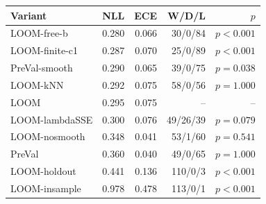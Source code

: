 \begin{tabular}{lrrrr}
\toprule
Variant & NLL & ECE & W/D/L & $p$ \\
\midrule
LOOM-free-b & 0.280 & 0.066 & 30/0/84 & $p<0.001$ \\
LOOM-finite-c1 & 0.287 & 0.070 & 25/0/89 & $p<0.001$ \\
PreVal-smooth & 0.290 & 0.065 & 39/0/75 & $p=0.038$ \\
LOOM-kNN & 0.292 & 0.075 & 58/0/56 & $p=1.000$ \\
LOOM & 0.295 & 0.075 & -- & -- \\
LOOM-lambdaSSE & 0.300 & 0.076 & 49/26/39 & $p=0.079$ \\
LOOM-nosmooth & 0.348 & 0.041 & 53/1/60 & $p=0.541$ \\
PreVal & 0.360 & 0.040 & 49/0/65 & $p=1.000$ \\
LOOM-holdout & 0.441 & 0.136 & 110/0/3 & $p<0.001$ \\
LOOM-insample & 0.978 & 0.478 & 113/0/1 & $p<0.001$ \\
\bottomrule
\end{tabular}
